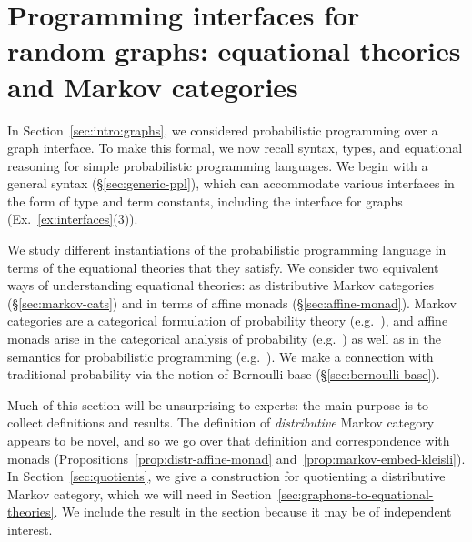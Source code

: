 \newcommand{\CatADet}{\CatA_{\mathsf{det}}}
\newcommand{\Kl}{\mathrm{Kl}}
\newcommand{\FP}{\mathrm{FP}}
\newcommand{\op}{^\mathrm{op}}

\section{Programming interfaces for random graphs: equational theories
and Markov categories}
In Section~\ref{sec:intro:graphs}, 
we considered probabilistic
programming over a graph interface. To make this formal, we now recall
syntax, types, and equational reasoning for simple probabilistic
programming languages.
We begin with a general syntax (\S\ref{sec:generic-ppl}), which can
accommodate various interfaces in the form of type and term
constants, including the interface for graphs (Ex.~\ref{ex:interfaces}(3)). 

We study different instantiations of the probabilistic programming
language in terms of the equational theories that they satisfy. We
consider two equivalent ways of understanding equational theories: as
distributive Markov categories (\S\ref{sec:markov-cats}) and in terms
of affine monads (\S\ref{sec:affine-monad}). Markov categories are a
  categorical formulation of probability theory (e.g.~\cite{fritz}), and affine
  monads arise in the categorical analysis of probability (e.g.~\cite{fgpt-weakly-affine,jacobs-commutative-effectus,kock:commutative-monads-as-a-theory-of-distributions})
  as well as in the semantics for probabilistic programming
  (e.g.~\cite{lazyppl,dsp-layer,amorim-markov}). 
We make a connection with traditional probability via the notion of
Bernoulli base (\S\ref{sec:bernoulli-base}).

Much of this section will be unsurprising to experts: the main purpose is to collect
definitions and results. The definition of \emph{distributive} Markov
category appears to be novel, and so we go over that definition and
correspondence with monads (Propositions~\ref{prop:distr-affine-monad} and~\ref{prop:markov-embed-kleisli}).
In Section~\ref{sec:quotients}, we give a construction for quotienting a distributive Markov category, which we will need in Section~\ref{sec:graphons-to-equational-theories}.
We include the result in the section because it may be of independent interest.
  

